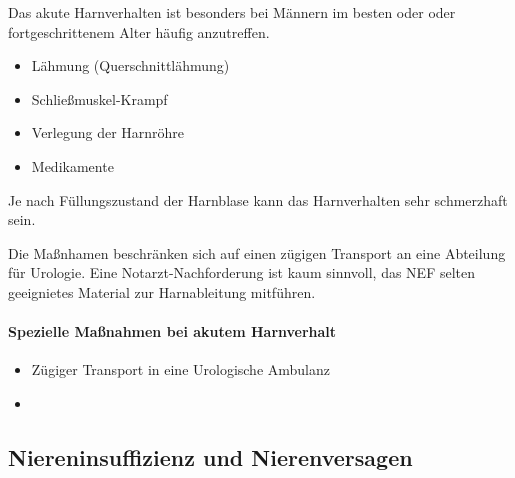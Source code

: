 


Das akute Harnverhalten ist besonders bei Männern im besten
oder oder fortgeschrittenem Alter häufig anzutreffen. 

{\begin{itemize}
    \item Lähmung (Querschnittlähmung)
    \item Schlie{\ss}muskel-Krampf
    \item Verlegung der Harnröhre
    \item Medikamente
\end{itemize}}

Je nach Füllungszustand der Harnblase kann das
Harnverhalten sehr schmerzhaft sein.

Die Maßnhamen beschränken sich auf einen zügigen Transport
an eine Abteilung für Urologie. Eine Notarzt-Nachforderung
ist kaum sinnvoll, das NEF selten geeignietes Material zur
Harnableitung mitführen. 


\paragraph{Spezielle Maßnahmen bei akutem Harnverhalt}

\begin{itemize}
    \item Z\"ugiger Transport in eine Urologische Ambulanz
    \item {}
\end{itemize}



\subsection{Niereninsuffizienz und Nierenversagen}

